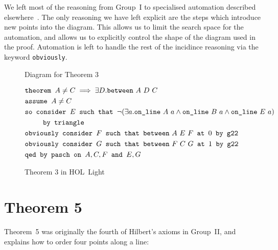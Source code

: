 We left most of the reasoning from Group~I to specialised automation described elsewhere~\cite{ScottExploring,ScottComposable}. The only reasoning we have left explicit are the steps which introduce new points into the diagram. This allows us to limit the search space for the automation, and allows us to explicitly control the shape of the diagram used in the proof. Automation is left to handle the rest of the incidince reasoning via the keyword \texttt{obviously}. 

\begin{figure}
\caption{Diagram for Theorem 3}
\label{fig:Theorem3Diagram}
\end{figure}

\begin{figure}
\begin{align*}
&\texttt{theorem }A \neq C \implies \exists D. \texttt{between}\ A\ D\ C\\
&\texttt{assume }A \neq C\\
&\texttt{so consider } E \texttt{ such that } \neg(\exists a.\texttt{on\_line}\ A\ a\wedge \texttt{on\_line}\ B\ a\wedge \texttt{on\_line}\ E\ a)\\
&\qquad\texttt{ by triangle}\\
&\texttt{obviously consider } F \texttt{ such that } \texttt{between}\ A\ E\ F \texttt{ at } 0 \texttt { by g22}\\
&\texttt{obviously consider } G \texttt{ such that } \texttt{between}\ F\ C\ G \texttt{ at } 1 \texttt { by g22}\\
&\texttt{qed by pasch on } A,C,F \texttt{ and } E,G
\end{align*}
\caption{Theorem 3 in HOL~Light}
\label{fig:Theorem3Formalised}
\end{figure}

\section{Theorem 5}\label{sec:Theorem5}
Theorem~5 was originally the fourth of Hilbert's axioms in Group~II, and explains how to order four points along a line:

